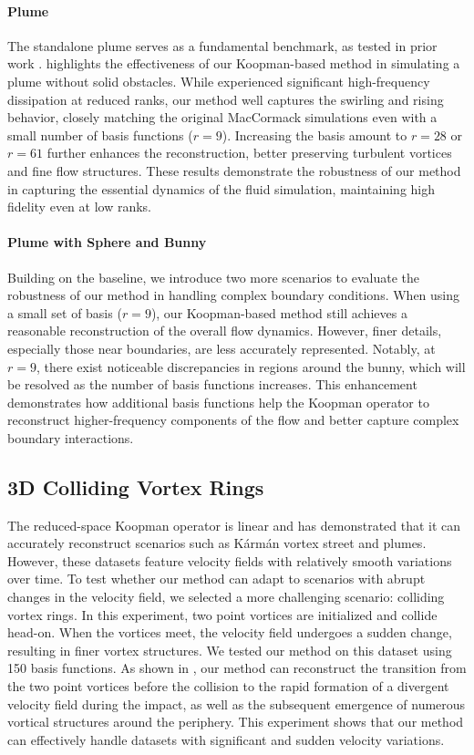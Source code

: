 \paragraph{\textbf{Plume}}
The standalone plume serves as a fundamental benchmark, as tested in prior work \cite{kim2013subspace}.  highlights the effectiveness of our Koopman-based method in simulating a plume without solid obstacles. While \cite{kim2013subspace} experienced significant high-frequency dissipation at reduced ranks, our method well captures the swirling and rising behavior, closely matching the original MacCormack simulations even with a small number of basis functions ($r=9$). Increasing the basis amount to $r=28$ or $r=61$ further enhances the reconstruction, better preserving turbulent vortices and fine flow structures. These results demonstrate the robustness of our method in capturing the essential dynamics of the fluid simulation, maintaining high fidelity even at low ranks.

\paragraph{\textbf{Plume with Sphere and Bunny}}
Building on the baseline, we introduce two more scenarios to evaluate the robustness of our method in handling complex boundary conditions. When using a small set of basis ($r=9$), our Koopman-based method still achieves a reasonable reconstruction of the overall flow dynamics. However, finer details, especially those near boundaries, are less accurately represented. Notably, at $r=9$, there exist noticeable discrepancies in regions around the bunny, which will be resolved as the number of basis functions increases. This enhancement demonstrates how additional basis functions help the Koopman operator to reconstruct higher-frequency components of the flow and better capture complex boundary interactions.

\subsection{3D Colliding Vortex Rings}
The reduced-space Koopman operator is linear and has demonstrated that it can accurately reconstruct scenarios such as Kármán vortex street and plumes. However, these datasets feature velocity fields with relatively smooth variations over time. To test whether our method can adapt to scenarios with abrupt changes in the velocity field, we selected a more challenging scenario: colliding vortex rings. In this experiment, two point vortices are initialized and collide head-on. When the vortices meet, the velocity field undergoes a sudden change, resulting in finer vortex structures. We tested our method on this dataset using 150 basis functions. As shown in , our method can reconstruct the transition from the two point vortices before the collision to the rapid formation of a divergent velocity field during the impact, as well as the subsequent emergence of numerous vortical structures around the periphery. This experiment shows that our method can effectively handle datasets with significant and sudden velocity variations.


